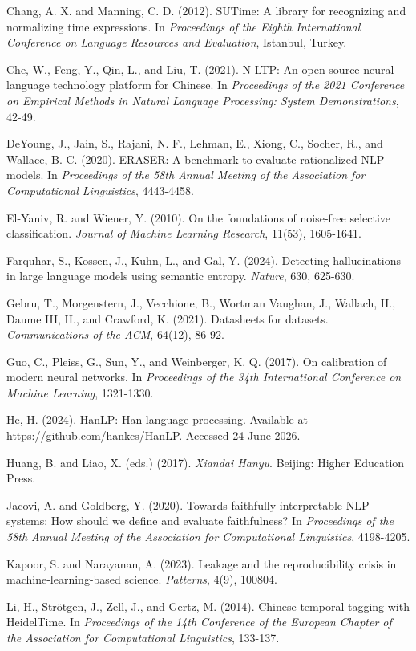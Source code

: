 \documentclass{CUP-JNL-NLP}
\begin{document}
Chang, A. X. and Manning, C. D. (2012). SUTime: A library for recognizing and normalizing time expressions. In \emph{Proceedings of the Eighth International Conference on Language Resources and Evaluation}, Istanbul, Turkey.

Che, W., Feng, Y., Qin, L., and Liu, T. (2021). N-LTP: An open-source neural language technology platform for Chinese. In \emph{Proceedings of the 2021 Conference on Empirical Methods in Natural Language Processing: System Demonstrations}, 42-49.

DeYoung, J., Jain, S., Rajani, N. F., Lehman, E., Xiong, C., Socher, R., and Wallace, B. C. (2020). ERASER: A benchmark to evaluate rationalized NLP models. In \emph{Proceedings of the 58th Annual Meeting of the Association for Computational Linguistics}, 4443-4458.

El-Yaniv, R. and Wiener, Y. (2010). On the foundations of noise-free selective classification. \emph{Journal of Machine Learning Research}, 11(53), 1605-1641.

Farquhar, S., Kossen, J., Kuhn, L., and Gal, Y. (2024). Detecting hallucinations in large language models using semantic entropy. \emph{Nature}, 630, 625-630.

Gebru, T., Morgenstern, J., Vecchione, B., Wortman Vaughan, J., Wallach, H., Daume III, H., and Crawford, K. (2021). Datasheets for datasets. \emph{Communications of the ACM}, 64(12), 86-92.

Guo, C., Pleiss, G., Sun, Y., and Weinberger, K. Q. (2017). On calibration of modern neural networks. In \emph{Proceedings of the 34th International Conference on Machine Learning}, 1321-1330.

He, H. (2024). HanLP: Han language processing. Available at https://github.com/hankcs/HanLP. Accessed 24 June 2026.

Huang, B. and Liao, X. (eds.) (2017). \emph{Xiandai Hanyu}. Beijing: Higher Education Press.

Jacovi, A. and Goldberg, Y. (2020). Towards faithfully interpretable NLP systems: How should we define and evaluate faithfulness? In \emph{Proceedings of the 58th Annual Meeting of the Association for Computational Linguistics}, 4198-4205.

Kapoor, S. and Narayanan, A. (2023). Leakage and the reproducibility crisis in machine-learning-based science. \emph{Patterns}, 4(9), 100804.

Li, H., Strötgen, J., Zell, J., and Gertz, M. (2014). Chinese temporal tagging with HeidelTime. In \emph{Proceedings of the 14th Conference of the European Chapter of the Association for Computational Linguistics}, 133-137.
\end{document}
